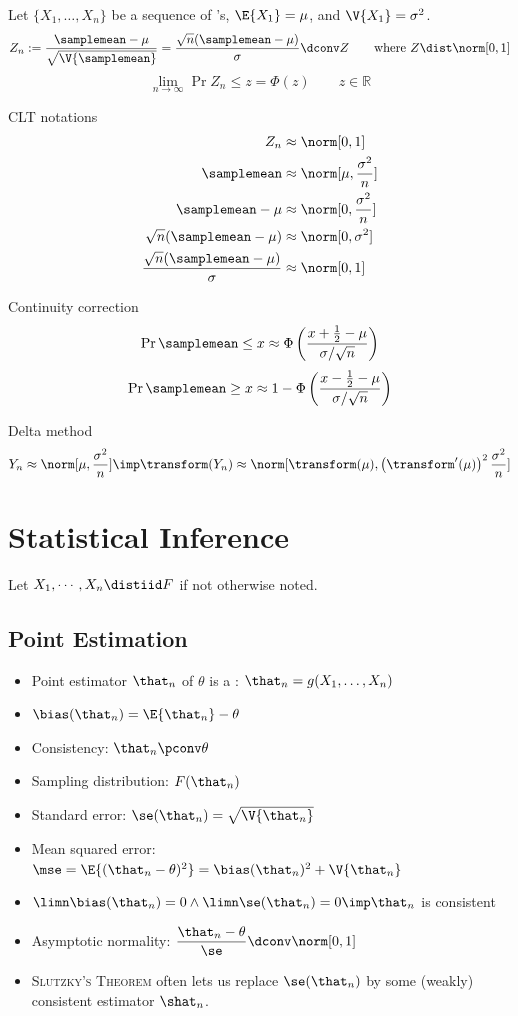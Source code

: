 \documentclass[landscape]{article}
\begin{document}
\begin{multicols*}{2}
Let $\{X_1,\ldots,X_n\}$ be a sequence of \iid \rv's, $\E{X_1}=\mu$, and
$\V{X_1} = \sigma^2$.\\

\[ Z_n
  := \displaystyle\frac{\samplemean-\mu}{\sqrt{\V{\samplemean}}}
  = \displaystyle\frac{\sqrt{n}(\samplemean - \mu)}{\sigma}
  \dconv Z \qquad \text{where } Z\dist \norm[0,1]\]
\[\lim_{n\to\infty} \Pr{Z_n \le z} = \Phi(z) \qquad z \in \mathbb R\]

CLT notations
\begin{align*}
Z_n &\approx \norm[0,1] \\
\samplemean &\approx \norm[\mu,\frac{\sigma^2}{n}] \\
\samplemean - \mu &\approx \norm[0,\frac{\sigma^2}{n}] \\
\sqrt{n}(\samplemean - \mu) &\approx \norm[0,\sigma^2] \\
\frac{\sqrt{n}(\samplemean - \mu)}{\sigma} &\approx \norm[0,1] \\
\end{align*}

Continuity correction
\[\Pr{\samplemean \le x} \approx
  \Phi\left(\displaystyle\frac{x+\frac{1}{2}-\mu}{\sigma/\sqrt{n}}\right)\]
\[\Pr{\samplemean \ge x} \approx
  1-\Phi\left(\displaystyle\frac{x-\frac{1}{2}-\mu}{\sigma/\sqrt{n}}\right)\]

Delta method
\[Y_n \approx \norm[\mu,\frac{\sigma^2}{n}] \imp
\transform(Y_n) \approx
\norm[\transform(\mu),
  \left(\transform'(\mu)\right)^2\frac{\sigma^2}{n}]\]

\section{Statistical Inference}

Let $X_1,\cdots,X_n \distiid F$ if not otherwise noted.

\subsection{Point Estimation}

\begin{itemize}
  \item Point estimator $\that_n$ of $\theta$ is a \rv:
    $\that_n = g(X_1,\dots,X_n)$
  \item $\bias(\that_n) = \E{\that_n}-\theta$
  \item Consistency: $\that_n \pconv \theta$
  \item Sampling distribution: $F(\that_n)$
  \item Standard error: $\se(\that_n) = \sqrt{\V{\that_n}}$
  \item Mean squared error: $\mse = \E{(\that_n-\theta)^2}
    = \bias(\that_n)^2 + \V{\that_n}$
  \item $\limn \bias(\that_n) = 0 \wedge \limn\se(\that_n) = 0
    \imp \that_n$ is consistent
  \item Asymptotic normality:
    $\displaystyle\frac{\that_n-\theta}{\se} \dconv \norm[0,1]$
  \item \textsc{Slutzky's Theorem} often lets us replace $\se(\that_n)$ by some
    (weakly) consistent estimator $\shat_n$.
\end{itemize}


\end{multicols*}
\end{document}
